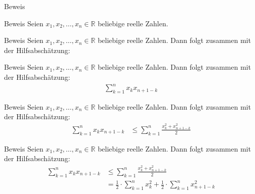 \documentclass[10pt]{beamer}
\def\bR{\mathbb{R}}
\begin{document}
\begin{frame}{Beweis}
    
\end{frame}



\begin{frame}{Beweis}
    Seien \( x_{1}, x_{2}, \ldots, x_{n} \in \bR \) beliebige reelle Zahlen.
\end{frame}



\begin{frame}{Beweis}
    Seien \( x_{1}, x_{2}, \ldots, x_{n} \in \bR \) beliebige reelle Zahlen. Dann folgt zusammen mit der Hilfsabschätzung:
\end{frame}



\begin{frame}{Beweis}
    Seien \( x_{1}, x_{2}, \ldots, x_{n} \in \bR \) beliebige reelle Zahlen. Dann folgt zusammen mit der Hilfsabschätzung:
    \begin{align*}
        \sum_{k = 1}^{n} x_{k}x_{n + 1 - k}
    \end{align*}
\end{frame}



\begin{frame}{Beweis}
    Seien \( x_{1}, x_{2}, \ldots, x_{n} \in \bR \) beliebige reelle Zahlen. Dann folgt zusammen mit der Hilfsabschätzung:
    \begin{align*}
        \sum_{k = 1}^{n} x_{k}x_{n + 1 - k}
        & \leq \sum_{k = 1}^{n} \frac{x_{k}^{2} + x_{n + 1 - k}^{2}}{2}
    \end{align*}
\end{frame}



\begin{frame}{Beweis}
    Seien \( x_{1}, x_{2}, \ldots, x_{n} \in \bR \) beliebige reelle Zahlen. Dann folgt zusammen mit der Hilfsabschätzung:
    \begin{align*}
        \sum_{k = 1}^{n} x_{k}x_{n + 1 - k}
        & \leq \sum_{k = 1}^{n} \frac{x_{k}^{2} + x_{n + 1 - k}^{2}}{2} \\
        & = \frac{1}{2} \cdot \sum_{k = 1}^{n} x_{k}^{2} + \frac{1}{2} \cdot \sum_{k = 1}^{n} x_{n + 1 - k}^{2}
    \end{align*}
\end{frame}
\end{document}
